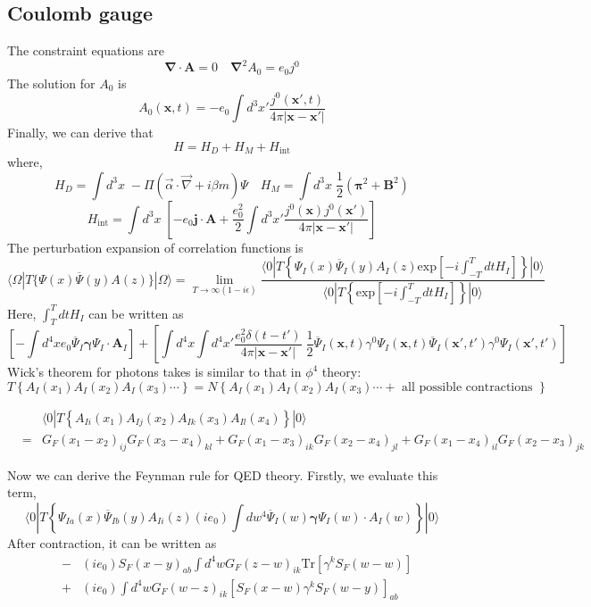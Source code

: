 \subsection{Coulomb gauge}
\noindent
The constraint equations are
\[\bm{\nabla} \cdot \bm{A} = 0 \quad \bm{\nabla}^2 A_0 = e_0j^0\]
The solution for $A_0$ is
\[A_0(\bm{x},t) = -e_0 \int d^3 x' \frac{j^0(\bm{x}',t)}{4\pi|\bm{x}-\bm{x}'|}\]
Finally, we can derive that
\[H = H_{D} + H_{M} + H_{\mathrm{int}}\]
where,
\[H_{D} = \int d^3 x \; -\Pi (\vec{\alpha} \cdot \vec{\nabla} + i \beta m)\Psi \quad H_{M} = \int d^3x \; \frac{1}{2}(\bm{\pi}^2 + \bm{B}^2)\]
\[H_{\mathrm{int}} = \int d^3x \; \left[-e_0\bm{j}\cdot\bm{A} + \frac{e_0^2}{2} \int d^3x' \frac{j^0(\bm{x}) j^0(\bm{x}')}{4\pi|\bm{x}-\bm{x}'|} \right]\]
The perturbation expansion of correlation functions is
\[\langle \Omega | T \{\Psi(x) \overline{\Psi}(y) A(z) \} | \Omega \rangle = \lim_{T \to \infty(1-i\epsilon)} \frac{\langle 0 | T \left\{ \Psi_I(x) \overline{\Psi}_I(y) A_I(z) \mathrm{exp} \left[ -i \int_{-T}^{T} dt H_I \right]\right\} | 0 \rangle}{\langle 0 | T \left\{ \mathrm{exp} \left[ -i \int_{-T}^{T} dt H_I \right]\right\} | 0 \rangle}\]
Here, $\int_{T}^{T} dt H_I$ can be written as
\[\left[-\int d^4x e_0\overline{\Psi}_I\bm{\gamma}\Psi_I\cdot\bm{A}_I \right] +\left[ \int d^4x \int d^4x' \frac{e_0^2\delta(t-t')}{4\pi|\bm{x}-\bm{x}'|}\; \frac{1}{2} \overline{\Psi}_I(\bm{x},t)\gamma^0 \Psi_I(\bm{x},t) \overline{\Psi}_I(\bm{x}',t')\gamma^0 \Psi_I(\bm{x}',t') \right]\]
Wick’s theorem for photons takes is similar to that in $\phi^4$ theory:
\[T \left\{ A_I(x_1) A_I(x_2)  A_I(x_3) \cdots \right\} = N \left\{A_I(x_1) A_I(x_2)  A_I(x_3) \cdots + \mbox{ all possible contractions }\right\} \]
\begin{example}
\begin{eqnarray}
&& \langle 0 | T \left\{ A_{Ii}(x_1) A_{Ij}(x_2) A_{Ik}(x_3) A_{Il}(x_4)\right\}| 0 \rangle \nonumber \\
&=&  G_F(x_1-x_2)_{ij} G_F(x_3-x_4)_{kl} + G_F(x_1-x_3)_{ik}G_F(x_2-x_4)_{jl} +  G_F(x_1-x_4)_{il}G_F(x_2-x_3)_{jk} \nonumber
\end{eqnarray}
\end{example}
\noindent
Now we can derive the Feynman rule for QED theory.
Firstly, we evaluate this term,
\[\langle 0 | T \left\{ \Psi_{Ia}(x) \overline{\Psi}_{Ib}(y) A_{Ii}(z) (i e_0) \int dw^4 \overline{\Psi}_I(w) \bm{\gamma} \Psi_I(w) \cdot A_I(w) \right\} | 0 \rangle\]
After contraction, it can be written as
\begin{eqnarray}
&-&  (ie_0) S_F(x-y)_{ab} \int d^4 w G_F(z-w)_{ik} \mathrm{Tr}[\gamma^k S_F(w-w)] \nonumber \\
&+&  (ie_0) \int d^4 w G_F(w-z)_{ik}  [S_F(x-w) \gamma^k S_F(w-y)]_{ab}  \nonumber
\end{eqnarray}
